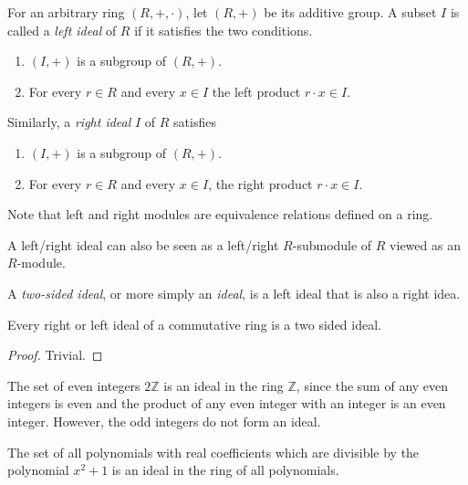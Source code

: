 \documentclass{article}
\begin{document}
    \begin{definition}
      For an arbitrary ring $(R,+, \cdot)$, let $(R, +)$ be its additive group. A subset $I$ is called a \textit{left ideal} of $R$ if it satisfies the two conditions. 
      \begin{enumerate}
        \item $(I, +)$ is a subgroup of $(R, +)$. 
        \item For every $r \in R$ and every $x \in I$ the left product $r \cdot x \in I$. 
      \end{enumerate}
      Similarly, a \textit{right ideal} $I$ of $R$ satisfies
      \begin{enumerate}
        \item $(I, +)$ is a subgroup of $(R, +)$. 
        \item For every $r \in R$ and every $x \in I$, the right product $r \cdot x \in I$. 
      \end{enumerate}
      Note that left and right modules are equivalence relations defined on a ring. 
    \end{definition}

    A left/right ideal can also be seen as a left/right $R$-submodule of $R$ viewed as an $R$-module. 

    \begin{definition}
      A \textit{two-sided ideal}, or more simply an \textit{ideal}, is a left ideal that is also a right idea. 
    \end{definition}

    \begin{proposition}
      Every right or left ideal of a commutative ring is a two sided ideal. 
    \end{proposition}
    \begin{proof}
      Trivial. 
    \end{proof}

    \begin{example}
      The set of even integers $2 \mathbb{Z}$ is an ideal in the ring $\mathbb{Z}$, since the sum of any even integers is even and the product of any even integer with an integer is an even integer. However, the odd integers do not form an ideal. 
    \end{example}

    \begin{example}
      The set of all polynomials with real coefficients which are divisible by the polynomial $x^2 + 1$ is an ideal in the ring of all polynomials. 
    \end{example}
\end{document}

